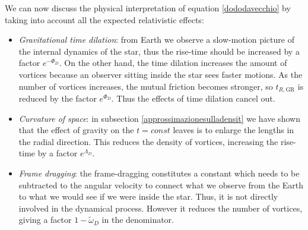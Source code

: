 \documentclass[usenatbib%
]{mnras}
\begin{document}
We can now discuss the physical interpretation of equation \eqref{dododavecchio} by taking into account all the expected relativistic effects:
\begin{itemize}
	
\item \textit{Gravitational time dilation}: from Earth we observe a slow-motion picture of the internal dynamics of the star, thus the rise-time should be increased by a factor $e^{-\Phi_D}$. On the other hand, the time dilation increases the amount of vortices because an observer sitting inside the star sees faster motions. As the number of vortices increases, the mutual friction becomes stronger, so $t_{R,\textrm{GR}}$ is reduced by the factor $e^{\Phi_D}$. Thus the effects of time dilation cancel out.

\item \textit{Curvature of space}: in subsection \ref{approssimazionesulladensit} we have shown that the effect of gravity on the $t=const$ leaves is to enlarge the lengths in the radial direction. This reduces the density of vortices, increasing the rise-time by a factor $e^{\Lambda_D}$.

\item \textit{Frame dragging}: the frame-dragging constitutes a constant which needs to be subtracted to the angular velocity to connect what we observe from the Earth to what we would see if we were inside the star. Thus, it is not directly involved in the dynamical process. However it reduces the number of vortices, giving a factor $1-\tilde{\omega}_D$ in the denominator. 
\end{itemize}
\end{document}
